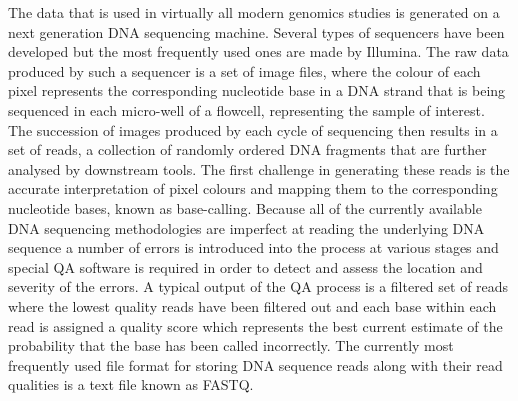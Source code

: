 The data that is used in virtually all modern genomics studies is generated on a next generation DNA sequencing machine. Several types of sequencers have been developed but the most frequently used ones are made by Illumina. The raw data produced by such a sequencer is a set of image files, where the colour of each pixel represents the corresponding nucleotide base in a DNA strand that is being sequenced in each micro-well of a flowcell, representing the sample of interest. The succession of images produced by each cycle of sequencing then results in a set of reads, a collection of randomly ordered DNA fragments that are further analysed by downstream tools. The first challenge in generating these reads is the accurate interpretation of pixel colours and mapping them to the corresponding nucleotide bases, known as base-calling. Because all of the currently available DNA sequencing methodologies are imperfect at reading the underlying DNA sequence a number of errors is introduced into the process at various stages and special QA software is required in order to detect and assess the location and severity of the errors. A typical output of the QA process is a filtered set of reads where the lowest quality reads have been filtered out and each base within each read is assigned a quality score which represents the best current estimate of the probability that the base has been called incorrectly. The currently most frequently used file format for storing DNA sequence reads along with their read qualities is a text file known as FASTQ.

